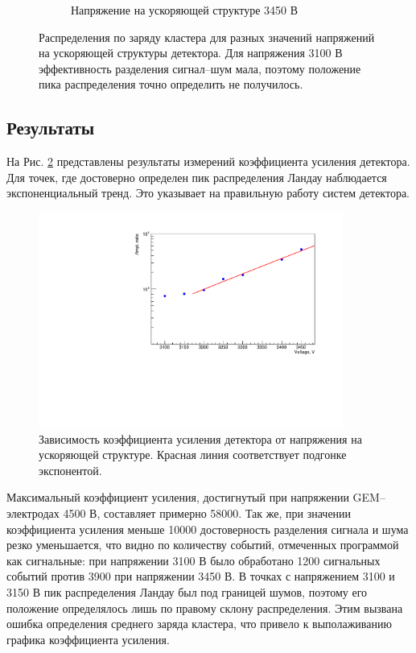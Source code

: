 \begin{figure}[h]
\begin{subfigure}{.45\textwidth}
	\caption{Напряжение на ускоряющей структуре 3450 В}
\end{subfigure}
\caption{Распределения по заряду кластера для разных значений напряжений на ускоряющей структуры детектора. Для напряжения 3100 В эффективность разделения сигнал--шум мала, поэтому положение пика распределения точно определить не получилось.}
\label{fig:charge_landau}
\end{figure}

\subsection{Результаты}
На Рис. \ref{fig:ampl_graph} представлены результаты измерений коэффициента усиления детектора. Для точек, где достоверно определен пик распределения Ландау наблюдается экспоненциальный тренд. Это указывает на правильную работу систем детектора.
\begin{figure}[h]
	\centering
	\includegraphics[width = 10cm]{img/Ampl_gr_log.pdf}
	\caption{Зависимость коэффициента усиления детектора от напряжения на ускоряющей структуре. Красная линия соответствует подгонке экспонентой.}
	\label{fig:ampl_graph}
\end{figure}
Максимальный коэффициент усиления, достигнутый при напряжении GEM--электродах 4500 В, составляет примерно 58000. Так же, при значении коэффициента усиления меньше 10000 достоверность разделения сигнала и шума резко уменьшается, что видно по количеству событий, отмеченных программой как сигнальные: при напряжении 3100 В было обработано 1200 сигнальных событий против 3900 при напряжении 3450 В. В точках с напряжением 3100 и 3150 В пик распределения Ландау был под границей шумов, поэтому его положение определялось лишь по правому склону распределения. Этим вызвана ошибка определения среднего заряда кластера, что привело к выполаживанию графика коэффициента усиления.

